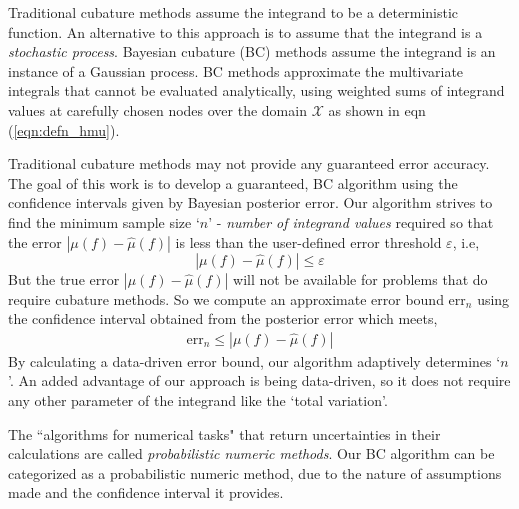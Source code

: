\documentclass[twocolumn]{svjour3}          %
\DeclareMathOperator{\Order}{{\mathcal O}}
\newcommand{\hmu}{\hat{\mu}}
\newcommand{\errtol}{\varepsilon}
\newcommand{\errn}{\text{err}_{n}}
\def\abs#1{\ensuremath{\left \lvert #1 \right \rvert}}
\begin{document}
Traditional cubature methods assume the integrand to be a deterministic function.
An alternative to this approach is to assume that the integrand is a \emph{stochastic process}.
Bayesian cubature (BC) methods assume the integrand is an instance of a Gaussian process. 
BC methods approximate the multivariate integrals that cannot be evaluated analytically, using weighted sums of integrand values at carefully chosen nodes over the domain $\mathcal{X}$ as shown in eqn  (\ref{eqn:defn_hmu}).





Traditional cubature methods may not provide any guaranteed error accuracy. 
The goal of this work is to develop a guaranteed, BC algorithm using the confidence intervals given by Bayesian posterior error. 
Our algorithm strives to find the minimum sample size `$n$' - \textit{number of integrand values} required so that the error $\abs{\mu(f) - \hmu(f)}$ is less than the user-defined error threshold $\errtol$, i.e, 
\[
\abs{\mu(f) - \hmu(f)} \leq \errtol 
\] 
But the true error $\abs{\mu(f) - \hmu(f)}$ will not be available for problems that do require cubature methods.
So we compute an approximate error bound $\errn$ using the confidence interval obtained from the posterior error which meets,
\begin{align*}
\errn \leq \abs{\mu(f) - \hmu(f)}
\end{align*}
By calculating a data-driven error bound, our algorithm adaptively determines `$n$'.
An added advantage of our approach is being data-driven, so it does not require any other parameter of the integrand like the `total variation'.


The ``algorithms for numerical tasks" that return uncertainties in their calculations are called \emph{probabilistic numeric methods}. %
Our BC algorithm can be categorized as a probabilistic numeric method, due to the nature of assumptions made and the confidence interval it provides.
\end{document}
